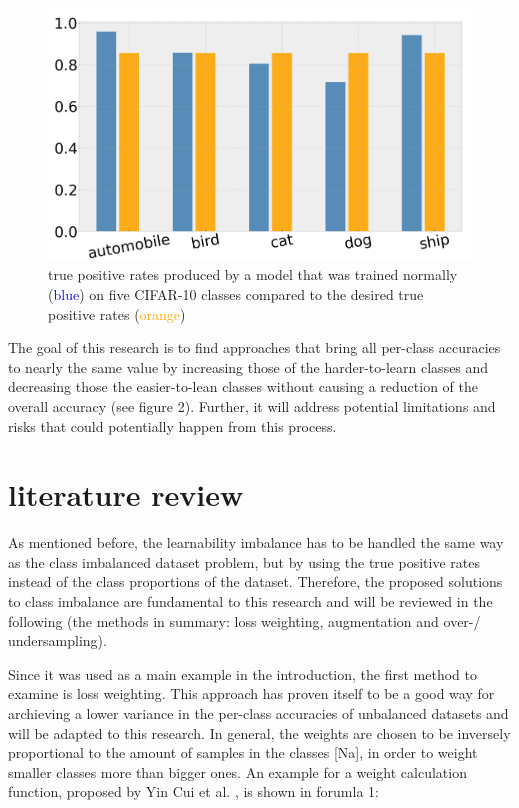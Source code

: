 \documentclass[journal]{IEEEtran}
\begin{document}
\begin{figure}[h!]
        \includegraphics[width=\linewidth]{images/tp_comparison.png}
        \caption{true positive rates produced by a model that was trained normally (\textcolor{blue}{blue}) on five CIFAR-10 classes compared to the desired true positive rates (\textcolor{orange}{orange})}
        \label{fig:tp_comparsion}
\end{figure}

The goal of this research is to find approaches that bring all per-class accuracies to nearly the same value by increasing those of the harder-to-learn classes
and decreasing those the easier-to-lean classes without causing a reduction of the overall accuracy (see figure 2).
Further, it will address potential limitations and risks that could potentially happen from this process.

\section{literature review}
As mentioned before, the learnability imbalance has to be handled the same way as the class imbalanced dataset problem, but by using the true positive rates instead of the class proportions of the dataset.
Therefore, the proposed solutions to class imbalance are fundamental to this research and will be reviewed in the following (the methods in summary: loss weighting, augmentation and over-/ undersampling).

Since it was used as a main example in the introduction, the first method to examine is loss weighting. 
This approach has proven itself to be a good way for archieving a lower variance in the per-class accuracies of unbalanced datasets and will be adapted to this research. 
In general, the weights are chosen to be inversely proportional to the amount of samples in the classes [Na], in order to weight smaller classes more than bigger ones. 
An example for a weight calculation function, proposed by Yin Cui et al. \cite{cui2019class}, is shown in forumla 1:
\end{document}

